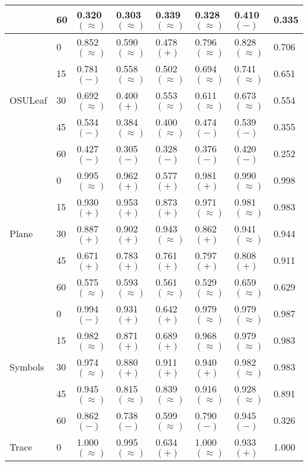 \documentclass{llncs}
\begin{document}
\begin{table*}[h!]
\begin{tabular*}{\linewidth}{l @{\extracolsep{\fill}} l l l l l l l}
    & 60 & 0.320 $(\approx)$ & 0.303 $(\approx)$ & 0.339 $(\approx)$ & 0.328 $(\approx)$ & 0.410 $(-)$ & 0.335\\
    \midrule
    \multirow{5}{0.13\linewidth}{OSULeaf}
    & 0 & 0.852 $(\approx)$ & 0.590 $(\approx)$ & 0.478 $(+)$ & 0.796 $(\approx)$ & 0.828 $(\approx)$ & 0.706\\
    & 15 & 0.781 $(-)$ & 0.558 $(\approx)$ & 0.502 $(\approx)$ & 0.694 $(\approx)$ & 0.741 $(\approx)$ & 0.651\\
    & 30 & 0.692 $(\approx)$ & 0.400 $(+)$ & 0.553 $(\approx)$ & 0.611 $(\approx)$ & 0.673 $(\approx)$ & 0.554\\
    & 45 & 0.534 $(-)$ & 0.384 $(\approx)$ & 0.400 $(\approx)$ & 0.474 $(-)$ & 0.539 $(-)$ & 0.355\\
    & 60 & 0.427 $(-)$ & 0.305 $(-)$ & 0.328 $(-)$ & 0.376 $(-)$ & 0.420 $(-)$ & 0.252\\
    \midrule
    \multirow{5}{0.13\linewidth}{Plane}
    & 0 & 0.995 $(\approx)$ & 0.962 $(+)$ & 0.577 $(+)$ & 0.981 $(+)$ & 0.990 $(\approx)$ & 0.998\\
    & 15 & 0.930 $(+)$ & 0.953 $(+)$ & 0.873 $(+)$ & 0.971 $(\approx)$ & 0.981 $(\approx)$ & 0.983\\
    & 30 & 0.887 $(+)$ & 0.902 $(+)$ & 0.943 $(\approx)$ & 0.862 $(+)$ & 0.941 $(\approx)$ & 0.944\\
    & 45 & 0.671 $(+)$ & 0.783 $(+)$ & 0.761 $(+)$ & 0.797 $(+)$ & 0.808 $(+)$ & 0.911\\
    & 60 & 0.575 $(\approx)$ & 0.593 $(\approx)$ & 0.561 $(\approx)$ & 0.529 $(\approx)$ & 0.659 $(\approx)$ & 0.629\\
    \midrule
    \multirow{5}{0.13\linewidth}{Symbols}
    & 0 & 0.994 $(-)$ & 0.931 $(+)$ & 0.642 $(+)$ & 0.979 $(\approx)$ & 0.979 $(\approx)$ & 0.987\\ 
    & 15 & 0.982 $(\approx)$ & 0.871 $(+)$ & 0.689 $(+)$ & 0.968 $(\approx)$ & 0.979 $(\approx)$ & 0.983\\
    & 30 & 0.974 $(\approx)$ & 0.880 $(+)$ & 0.911 $(+)$ & 0.940 $(+)$ & 0.982 $(\approx)$ & 0.983\\
    & 45 & 0.945 $(\approx)$ & 0.815 $(\approx)$ & 0.839 $(\approx)$ & 0.916 $(\approx)$ & 0.928 $(\approx)$ & 0.891\\
    & 60 & 0.862 $(-)$ & 0.738 $(-)$ & 0.599 $(\approx)$ & 0.790 $(-)$ & 0.945 $(-)$ & 0.326\\
    \midrule
    \multirow{5}{0.13\linewidth}{Trace}
    & 0 & 1.000 $(\approx)$ & 0.995 $(\approx)$ & 0.634 $(+)$ & 1.000 $(\approx)$ & 0.933 $(+)$ & 1.000\\

\end{tabular*}
\end{table*}
\end{document}
